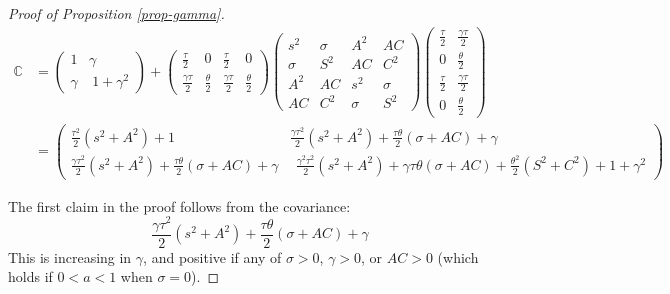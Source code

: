 \documentclass[
  12pt,
]{article}
\theoremstyle{definition}
\theoremstyle{definition}
\theoremstyle{definition}
\theoremstyle{definition}
\theoremstyle{remark}
\begin{document}
\begin{proof}[Proof of Proposition \ref{prop-gamma}]
\begin{align*}
\mathbb{C}  &= \left(\begin{array}{cc}
1 & \gamma\\
\gamma & \ 1+\gamma^{2}
\end{array}\right)+\left(\begin{array}{cccc}
\frac{\tau}{2} & 0 & \frac{\tau}{2} & 0\\
\frac{\gamma\tau}{2} & \frac{\theta}{2} & \frac{\gamma\tau}{2} & \frac{\theta}{2}
\end{array}\right)\left(\begin{array}{cccc}
s^{2} & \sigma & A^{2} & AC\\
\sigma & S^{2} & AC & C^{2}\\
A^{2} & AC & s^{2} & \sigma\\
AC & C^{2} & \sigma & S^{2}
\end{array}\right)\left(\begin{array}{cc}
\frac{\tau}{2} & \frac{\gamma\tau}{2}\\
0 & \frac{\theta}{2}\\
\frac{\tau}{2} & \frac{\gamma\tau}{2}\\
0 & \frac{\theta}{2}
\end{array}\right) \\
    &=\left(\begin{array}{cc}
\frac{\tau^{2}}{2}(s^{2}+A^{2})+1 & \frac{\gamma\tau^{2}}{2}(s^{2}+A^{2})+\frac{\tau\theta}{2}(\sigma+AC)+\gamma\\
\frac{\gamma\tau^{2}}{2}(s^{2}+A^{2})+\frac{\tau\theta}{2}(\sigma+AC)+\gamma & \ \ \frac{\gamma^{2}\tau^{2}}{2}(s^{2}+A^{2})+\gamma\tau\theta(\sigma+AC)+\frac{\theta^{2}}{2}(S^{2}+C^{2})+1+\gamma^{2}
\end{array}\right)
\end{align*}

The first claim in the proof follows from the covariance:
\[
\frac{\gamma\tau^{2}}{2}(s^{2}+A^{2})+\frac{\tau\theta}{2}(\sigma+AC)+\gamma
\]
This is increasing in $\gamma$, and positive if any of $\sigma > 0$, 
$\gamma > 0$,  or $AC > 0$ (which holds if $0 < a < 1$ when $\sigma = 0$).


\end{proof}
\end{document}
